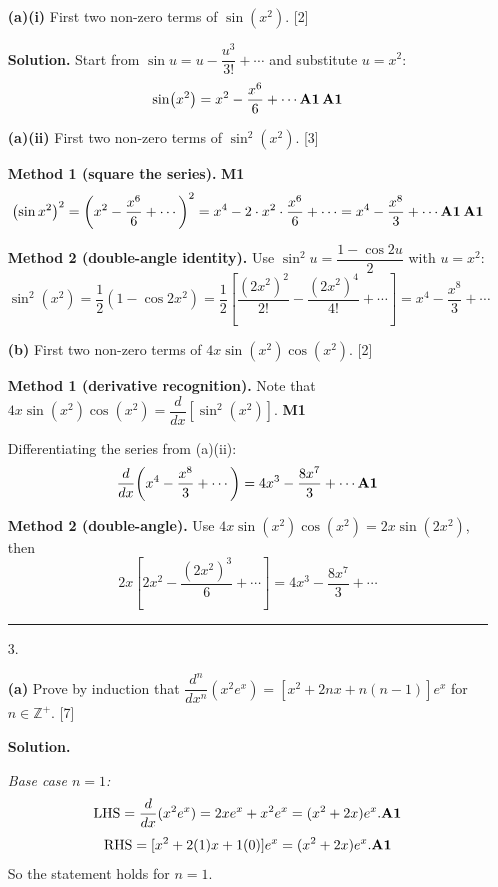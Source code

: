\documentclass[12pt, twoside]{article}
\begin{document}
\begin{enumerate}[itemsep=0.3cm]
\textbf{(a)(i)} First two non-zero terms of $\sin\!\left(x^2\right)$.
\hfill [2]

\textbf{Solution.} Start from $\sin u = u - \dfrac{u^3}{3!} + \cdots$ and
substitute $u = x^2$:
\[
\sin\!\left(x^2\right) = x^2 - \frac{x^6}{6} + \cdots
\hfill \textbf{A1\,A1}
\]

\medskip

\textbf{(a)(ii)} First two non-zero terms of $\sin^2\!\left(x^2\right)$.
\hfill [3]

\textbf{Method 1 (square the series).} \hfill \textbf{M1}
\[
\left(\sin x^2\right)^2 = \left(x^2 - \frac{x^6}{6} + \cdots\right)^2
= x^4 - 2 \cdot x^2 \cdot \frac{x^6}{6} + \cdots
= x^4 - \frac{x^8}{3} + \cdots \hfill \textbf{A1\,A1}
\]

\textbf{Method 2 (double-angle identity).} Use
$\sin^2 u = \dfrac{1 - \cos 2u}{2}$ with $u = x^2$:
\[
\sin^2\!\left(x^2\right) = \frac{1}{2}\!\left(1 - \cos 2x^2\right)
= \frac{1}{2}\!\left[\frac{(2x^2)^2}{2!} - \frac{(2x^2)^4}{4!} + \cdots\right]
= x^4 - \frac{x^8}{3} + \cdots
\]

\medskip

\textbf{(b)} First two non-zero terms of
$4x \sin\!\left(x^2\right) \cos\!\left(x^2\right)$. \hfill [2]

\textbf{Method 1 (derivative recognition).} Note that
$4x \sin(x^2) \cos(x^2) = \dfrac{d}{dx}\!\left[\sin^2(x^2)\right]$.
\hfill \textbf{M1}

Differentiating the series from (a)(ii):
\[
\frac{d}{dx}\!\left(x^4 - \frac{x^8}{3} + \cdots\right)
= 4x^3 - \frac{8x^7}{3} + \cdots \hfill \textbf{A1}
\]

\textbf{Method 2 (double-angle).} Use
$4x \sin(x^2)\cos(x^2) = 2x \sin(2x^2)$, then
\[
2x\!\left[2x^2 - \frac{(2x^2)^3}{6} + \cdots\right]
= 4x^3 - \frac{8x^7}{3} + \cdots
\]

\bigskip
\hrule
\bigskip

\item[3.] 

\textbf{(a)} Prove by induction that
$\dfrac{d^n}{dx^n}(x^2 e^x) = [x^2 + 2nx + n(n-1)] e^x$
for $n \in \mathbb{Z}^{+}$. \hfill [7]

\textbf{Solution.}

\textit{Base case $n = 1$:}
\[
\text{LHS} = \frac{d}{dx}(x^2 e^x) = 2x e^x + x^2 e^x
= (x^2 + 2x) e^x. \hfill \textbf{A1}
\]
\[
\text{RHS} = [x^2 + 2(1)x + 1(0)] e^x = (x^2 + 2x) e^x. \hfill \textbf{A1}
\]
So the statement holds for $n = 1$.


\end{enumerate}
\end{document}
